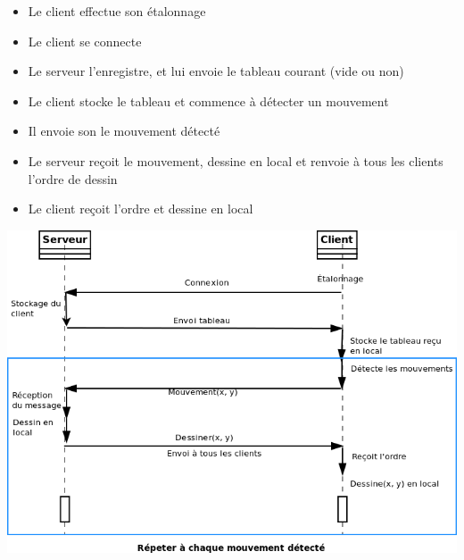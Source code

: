 \documentclass{article}
\begin{document}
\begin{itemize}
	\item Le client effectue son étalonnage
	\item Le client se connecte
	\item Le serveur l'enregistre, et lui envoie le tableau courant (vide ou non)
	\item Le client stocke le tableau et commence à détecter un mouvement
	\item Il envoie son le mouvement détecté
	\item Le serveur reçoit le mouvement, dessine en local et renvoie à tous les clients l'ordre de dessin
	\item Le client reçoit l'ordre et dessine en local
\end{itemize}

\begin{center}
	\includegraphics[scale=0.5]{../uml/sequence_reseau.png}
\end{center}
\end{document}
